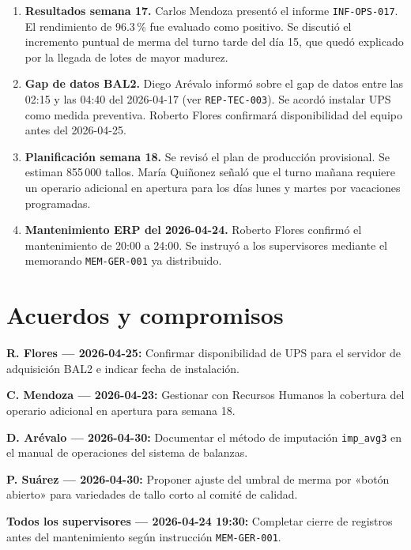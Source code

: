 \documentclass{../base/canon}
\begin{document}
\begin{enumerate}
  \item \textbf{Resultados semana 17.}  Carlos Mendoza presentó el informe
        \texttt{INF-OPS-017}.  El rendimiento de 96.3\,\% fue evaluado como positivo.
        Se discutió el incremento puntual de merma del turno tarde del día 15, que
        quedó explicado por la llegada de lotes de mayor madurez.

  \item \textbf{Gap de datos BAL2.}  Diego Arévalo informó sobre el gap de datos
        entre las 02:15 y las 04:40 del 2026-04-17 (ver \texttt{REP-TEC-003}).
        Se acordó instalar UPS como medida preventiva.  Roberto Flores confirmará
        disponibilidad del equipo antes del 2026-04-25.

  \item \textbf{Planificación semana 18.}  Se revisó el plan de producción
        provisional.  Se estiman 855\,000 tallos.  María Quiñonez señaló que el
        turno mañana requiere un operario adicional en apertura para los días lunes
        y martes por vacaciones programadas.

  \item \textbf{Mantenimiento ERP del 2026-04-24.}  Roberto Flores confirmó el
        mantenimiento de 20:00 a 24:00.  Se instruyó a los supervisores mediante el
        memorando \texttt{MEM-GER-001} ya distribuido.
\end{enumerate}

\section{Acuerdos y compromisos}

\begin{AcuerdosList}
  \item \textbf{R. Flores — 2026-04-25:} Confirmar disponibilidad de UPS para el
        servidor de adquisición BAL2 e indicar fecha de instalación.

  \item \textbf{C. Mendoza — 2026-04-23:} Gestionar con Recursos Humanos la
        cobertura del operario adicional en apertura para semana 18.

  \item \textbf{D. Arévalo — 2026-04-30:} Documentar el método de imputación
        \texttt{imp\_avg3} en el manual de operaciones del sistema de balanzas.

  \item \textbf{P. Suárez — 2026-04-30:} Proponer ajuste del umbral de merma por
        «botón abierto» para variedades de tallo corto al comité de calidad.

  \item \textbf{Todos los supervisores — 2026-04-24 19:30:} Completar cierre de
        registros antes del mantenimiento según instrucción \texttt{MEM-GER-001}.
\end{AcuerdosList}
\end{document}
